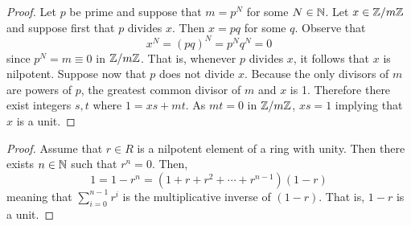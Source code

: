 \documentclass[../../AlgebraQualSolutions.tex]{subfiles}
\begin{document}
\begin{proof}
    Let $p$ be prime and suppose that $m = p^N$ for some $N \in \mathbb{N}$. Let $x \in \mathbb{Z}/m\mathbb{Z}$ and suppose first that $p$ divides $x$. Then $x = pq$ for some $q$. Observe that
        \[x^N = (pq)^N = p^Nq^N = 0\]
    since $p^N = m \equiv 0$ in $\mathbb{Z}/m\mathbb{Z}$. That is, whenever $p$ divides $x$, it follows that $x$ is nilpotent. Suppose now that $p$ does not divide $x$. Because the only divisors of $m$ are powers of $p$, the greatest common divisor of $m$ and $x$ is 1. Therefore there exist integers $s,t$ where $1 = xs + mt$. As $mt = 0$ in $\mathbb{Z}/m\mathbb{Z}$, $xs = 1$ implying that $x$ is a unit.
\end{proof}

\begin{proof}
    Assume that $r \in R$ is a nilpotent element of a ring with unity. Then there exists $n \in \mathbb{N}$ such that $r^n = 0$. Then,
        \[1 = 1 - r^n = (1 + r + r^2 + \cdots + r^{n-1})(1-r)\]
    meaning that $\sum_{i=0}^{n-1}r^i$ is the multiplicative inverse of $(1-r)$. That is, $1-r$ is a unit.
\end{proof}
\end{document}
